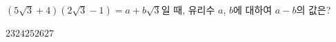 $(5\sqrt{3}+4)(2\sqrt{3}-1)=a+b\sqrt{3}$일 때, 유리수 $a$, $b$에 대하여 $a-b$의 값은?
\begin{choices32}{$23$}{$24$}{$25$}{$26$}{$27$}\end{choices32}
